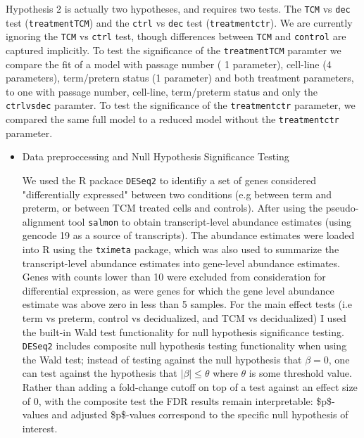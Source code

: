 \begin{itemize}
Hypothesis 2 is actually two hypotheses, and requires two tests. The \texttt{TCM} vs \texttt{dec} test (\texttt{treatmentTCM}) and the \texttt{ctrl} vs \texttt{dec} test (\texttt{treatmentctr}).
We are currently ignoring the \texttt{TCM} vs \texttt{ctrl} test, though differences between \texttt{TCM} and \texttt{control} are captured implicitly.  To test the significance of the \texttt{treatmentTCM} paramter we compare the fit of
a model with passage number ( 1 parameter), cell-line (4 parameters), term/pretern status (1 parameter) and both treatment parameters, to one with passage number, cell-line, term/preterm status and only the \texttt{ctrlvsdec} paramter.
To test the significance of the \texttt{treatmentctr} parameter, we compared the same full model to a reduced model without the \texttt{treatmentctr} parameter.


\begin{itemize}
\item Data preproccessing and Null Hypothesis Significance Testing
\label{sec:org653e6dd}

We used the R packace \texttt{DESeq2} \cite{DESeq2} to identifiy a set of genes considered "differentially expressed" between two conditions (e.g between term and preterm, or between TCM treated cells and controls).
After using the pseudo-alignment tool \texttt{salmon} \cite{salmon} to obtain transcript-level abundance estimates (using gencode 19 as a source of transcripts).  The abundance estimates were loaded into R 
using the \texttt{tximeta} package, \cite{tximeta} which was also used to summarize the transcript-level abundance estimates into gene-level abundance estimates.  Genes with counts lower than 10 were excluded from consideration
for differential expression, as were genes for which the gene level abundance estimate was above zero in less than 5 samples.  For the main effect tests (i.e term vs preterm, control vs decidualized, and TCM vs decidualized) 
 I used the built-in Wald test functionality for null hypothesis significance testing.  \texttt{DESeq2} includes composite null hypothesis testing functionality when using the Wald test; instead of testing against the null hypothesis 
that \(\beta =  0\), one can test against the hypothesis that \(\lvert \beta \rvert \leq \theta\) where \(\theta\) is some threshold value.  Rather than adding a fold-change cutoff on top of a test against an effect size of 0, with the composite test the FDR results remain interpretable: 
\$p\$-values and adjusted \$p\$-values correspond to the specific null hypothesis of interest.
\end{itemize}
\end{itemize}






